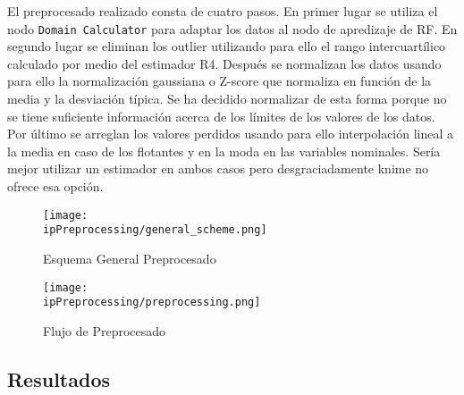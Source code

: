 \documentclass[..]{subfiles}
\begin{document}
El preprocesado realizado consta de cuatro pasos. En primer lugar se utiliza el nodo \texttt{Domain Calculator} para adaptar los datos al nodo de apredizaje de RF. En segundo lugar se eliminan los outlier utilizando para ello el rango intercuartílico calculado por medio del estimador R4. Después se normalizan los datos usando para ello la normalización gaussiana o Z-score que normaliza en función de la media y la desviación típica. Se ha decidido normalizar de esta forma porque no se tiene suficiente información acerca de los límites de los valores de los datos. Por último se arreglan los valores perdidos usando para ello interpolación lineal a la media en caso de los flotantes y en la moda en las variables nominales. Sería mejor utilizar un estimador en ambos casos pero desgraciadamente knime no ofrece esa opción.

\begin{figure}[h!]
	\centering
	\texttt{[image: \\ipPreprocessing/general\_scheme.png]}
	\caption{Esquema General Preprocesado}
	\label{fig:general_scheme_preprocessing}
\end{figure}

\begin{figure}[h!]
	\centering
	\texttt{[image: \\ipPreprocessing/preprocessing.png]}
	\caption{Flujo de Preprocesado}
	\label{fig:preprocesing}
\end{figure}


\clearpage
\subsection{Resultados}

\begin{figure}[h!]
	\centering
	
\end{figure}

\vspace{1.5em}
\end{document}
